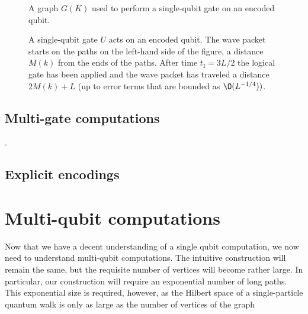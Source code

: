 \documentclass[../thesis-main/thesis-main]{subfiles}
\begin{document}
\begin{figure}
  \centering
  
  \label{fig:single_qubit_scattering_graph}
  \caption{A graph $G(K)$ used to perform a single-qubit gate on an encoded qubit. }
\end{figure}

\begin{figure}
  \centering
  
  \caption{A single-qubit gate $U$ acts on an encoded qubit. The wave packet starts on the paths on the left-hand side of the figure, a distance $M(k)$ from the ends of the paths. After time $t_{\mathrm{I}}={3L}/{2}$ the logical gate has been applied and the wave packet has traveled a distance $2M(k)+L$ (up to error terms that are bounded as $\O(L^{-{1}/{4}}))$.}
  \label{fig:single_particle_cartoon}
\end{figure}

\subsection{Multi-gate computations}

.


\subsection{Explicit encodings}





\section{Multi-qubit computations}
\label{sec:multi_qubit_computations}

Now that we have a decent understanding of a single qubit computation, we now need to understand multi-qubit computations.  The intuitive construction will remain the same, but the requisite number of vertices will become rather large.  In particular, our construction will require an exponential number of long paths.  This exponential size is required, however, as the Hilbert space of a single-particle quantum walk is only as large as the number of vertices of the graph
\end{document}
